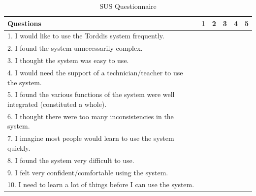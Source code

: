 \documentclass[a4paper,fleqn]{cas-sc}
\begin{document}
	\begin{table}[bt!]
		\caption{SUS Questionnaire \label{tab:SUSQuestion}}
		\centering
		\begin{tabular}{|p{10cm}|c|c|c|c|c|}
			\hline
			\textbf{Questions} & 1 & 2 & 3 & 4 & 5 \\
			\hline
			1. I would like to use the Torddis system frequently. & & & & & \\
			\hline
			2. I found the system unnecessarily complex. & & & & & \\
			\hline
			3. I thought the system was easy to use. & & & & & \\
			\hline
			4. I would need the support of a technician/teacher to use the system. & & & & & \\
			\hline
			5. I found the various functions of the system were well integrated (constituted a whole). & & & & & \\
			\hline
			6. I thought there were too many inconsistencies in the system. & & & & & \\
			\hline
			7. I imagine most people would learn to use the system quickly. & & & & & \\
			\hline
			8. I found the system very difficult to use. & & & & & \\
			\hline
			9. I felt very confident/comfortable using the system. & & & & & \\
			\hline
			10. I need to learn a lot of things before I can use the system. & & & & & \\
			\hline
		\end{tabular}
	\end{table}
	
\end{document}
